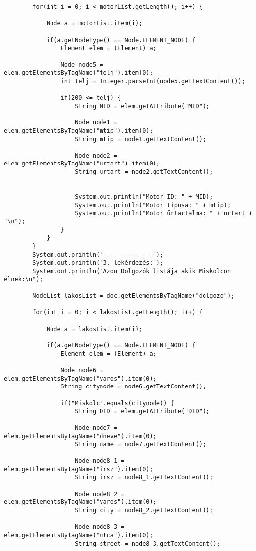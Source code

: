 \documentclass[14pt]{extarticle}
\begin{document}
\begin{normalsize}
\begin{verbatim}
		for(int i = 0; i < motorList.getLength(); i++) {
				
			Node a = motorList.item(i);
				
			if(a.getNodeType() == Node.ELEMENT_NODE) {
				Element elem = (Element) a;
				
				Node node5 = elem.getElementsByTagName("telj").item(0);
				int telj = Integer.parseInt(node5.getTextContent());
				
				if(200 <= telj) {
					String MID = elem.getAttribute("MID");

					Node node1 = elem.getElementsByTagName("mtip").item(0);
					String mtip = node1.getTextContent();

					Node node2 = elem.getElementsByTagName("urtart").item(0);
					String urtart = node2.getTextContent();
					
					
					System.out.println("Motor ID: " + MID);
					System.out.println("Motor típusa: " + mtip);
					System.out.println("Motor űrtartalma: " + urtart + "\n");
				}
			}
		}
		System.out.println("--------------");
		System.out.println("3. lekérdezés:");
		System.out.println("Azon Dolgozók listája akik Miskolcon élnek:\n");
		
		NodeList lakosList = doc.getElementsByTagName("dolgozo");
		
		for(int i = 0; i < lakosList.getLength(); i++) {
				
			Node a = lakosList.item(i);
				
			if(a.getNodeType() == Node.ELEMENT_NODE) {
				Element elem = (Element) a;
				
				Node node6 = elem.getElementsByTagName("varos").item(0);
				String citynode = node6.getTextContent();
				
				if("Miskolc".equals(citynode)) {
					String DID = elem.getAttribute("DID");
					
					Node node7 = elem.getElementsByTagName("dneve").item(0);
					String name = node7.getTextContent();
					
		            Node node8_1 = elem.getElementsByTagName("irsz").item(0);
		            String irsz = node8_1.getTextContent();
		            	  
		            Node node8_2 = elem.getElementsByTagName("varos").item(0);
		            String city = node8_2.getTextContent();
		            	  
		            Node node8_3 = elem.getElementsByTagName("utca").item(0);
		            String street = node8_3.getTextContent();
					

\end{verbatim}
\end{normalsize}
\end{document}
